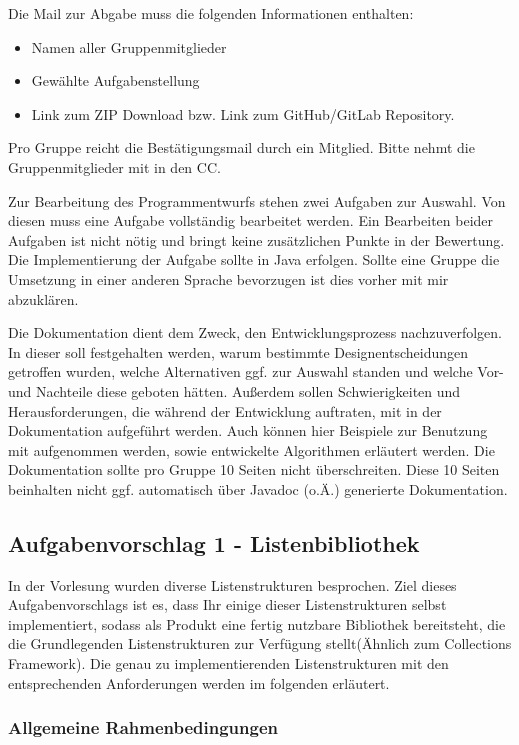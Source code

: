 \documentclass[a4paper,
			   fontsize=12pt]{article}
\begin{document}
Die Mail zur Abgabe muss die folgenden Informationen enthalten:
\begin{itemize}
	\item Namen aller Gruppenmitglieder
	\item Gewählte Aufgabenstellung
	\item Link zum ZIP Download bzw. Link zum GitHub/GitLab Repository.
\end{itemize}
Pro Gruppe reicht die Bestätigungsmail durch ein Mitglied. Bitte nehmt die Gruppenmitglieder mit in den CC.

Zur Bearbeitung des Programmentwurfs stehen zwei Aufgaben zur Auswahl. Von diesen muss eine Aufgabe vollständig bearbeitet werden. Ein Bearbeiten beider Aufgaben
ist nicht nötig und bringt keine zusätzlichen Punkte in der Bewertung. Die Implementierung der Aufgabe sollte in Java erfolgen. Sollte eine Gruppe die Umsetzung in
einer anderen Sprache bevorzugen ist dies vorher mit mir abzuklären.

Die Dokumentation dient dem Zweck, den Entwicklungsprozess nachzuverfolgen. In dieser soll festgehalten werden, warum bestimmte Designentscheidungen getroffen
wurden, welche Alternativen ggf. zur Auswahl standen und welche Vor- und Nachteile diese geboten hätten. Außerdem sollen Schwierigkeiten und Herausforderungen, 
die während der Entwicklung auftraten, mit in der Dokumentation aufgeführt werden. Auch können hier Beispiele zur Benutzung mit aufgenommen werden, sowie entwickelte 
Algorithmen erläutert werden. Die Dokumentation sollte pro Gruppe 10 Seiten nicht überschreiten. Diese 10 Seiten beinhalten nicht ggf. automatisch über Javadoc (o.Ä.) generierte Dokumentation.

\vspace{0,75cm}

\subsection*{Aufgabenvorschlag 1 - Listenbibliothek}

In der Vorlesung wurden diverse Listenstrukturen besprochen. Ziel dieses Aufgabenvorschlags ist es, dass Ihr einige dieser Listenstrukturen selbst implementiert, sodass als Produkt eine 
fertig nutzbare Bibliothek bereitsteht, die die Grundlegenden Listenstrukturen zur Verfügung stellt(Ähnlich zum Collections Framework). Die genau zu implementierenden Listenstrukturen mit
den entsprechenden Anforderungen werden im folgenden erläutert.

\subsubsection*{Allgemeine Rahmenbedingungen}
\end{document}
